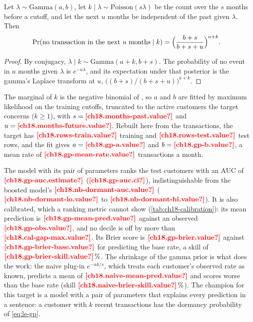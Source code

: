 \begin{proposition}\label{prop:le-gp}
Let $\lambda \sim \mathrm{Gamma}(a, b)$, let $k \mid \lambda \sim \mathrm{Poisson}(s \lambda)$ be the count over the $s$ months
before a cutoff, and let the next $u$ months be independent of the past given $\lambda$. Then
\begin{equation}\label{eq:le-gp}
  \Pr(\text{no transaction in the next } u \text{ months} \mid k) = \Bigl(\frac{b + s}{b + s + u}\Bigr)^{a + k}.
\end{equation}
\end{proposition}

\begin{proof}
By conjugacy, $\lambda \mid k \sim \mathrm{Gamma}(a + k, b + s)$. The probability of no event in $u$ months given $\lambda$ is
$e^{-u\lambda}$, and its expectation under that posterior is the gamma's Laplace transform at $u$,
$\bigl((b + s)/(b + s + u)\bigr)^{a + k}$.
\end{proof}

The marginal of $k$ is the negative binomial of \textcite{greenwood1920}, so $a$ and $b$ are fitted by maximum likelihood on
the training cutoffs, truncated to the active customers the target concerns ($k \ge 1$), with $s = \est{ch18.months-past}{value}$
and $u = \est{ch18.months-future}{value}$. Rebuilt here from the transactions, the target has $\est{ch18.rows-train}{value}$
training and $\est{ch18.rows-test}{value}$ test rows, and the fit gives $a = \est{ch18.gp-a}{value}$ and
$b = \est{ch18.gp-b}{value}$, a mean rate of $\est{ch18.gp-mean-rate}{value}$ transactions a month.

The model with its pair of parameters ranks the test customers with an AUC of $\est{ch18.gp-auc}{estimate}$ ($\est{ch18.gp-auc}{ci}$),
indistinguishable from the boosted model's $\est{ch18.nb-dormant-auc}{value}$ ($\est{ch18.nb-dormant-lo}{value}$ to
$\est{ch18.nb-dormant-hi}{value}$). It is also calibrated, which a ranking metric cannot show (\cref{tab:ch18-calibration}): its
mean prediction is $\est{ch18.gp-mean-pred}{value}$ against an observed $\est{ch18.gp-obs}{value}$, and no decile is off by more
than $\est{ch18.cal-gap-max}{value}$. Its Brier score \autocite{brier1950} is $\est{ch18.gp-brier}{value}$ against
$\est{ch18.gp-brier-base}{value}$ for predicting the base rate, a skill of $\est{ch18.gp-brier-skill}{value}\,\%$. The shrinkage
of the gamma prior is what does the work: the naive plug-in $e^{-u k / s}$, which treats each customer's observed rate as known,
predicts a mean of $\est{ch18.naive-mean-pred}{value}$ and scores worse than the base rate (skill
$\est{ch18.naive-brier-skill}{value}\,\%$). The champion for this target is a model with a pair of parameters that explains every prediction
in a sentence: a customer with $k$ recent transactions has the dormancy probability of \cref{eq:le-gp}.

